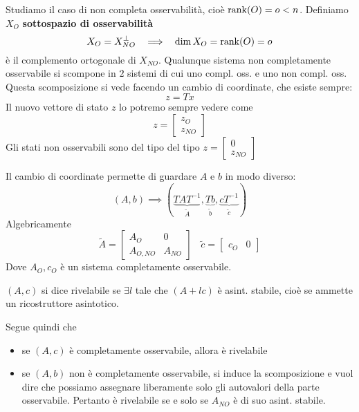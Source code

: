 Studiamo il caso di non completa osservabilità, cioè $\operatorname*{rank}(O) =o< n$. Definiamo $X_O$ \textbf{sottospazio di osservabilità}
\begin{equation*}
	X_O =X^{\perp }_{NO} \ \ \implies \ \ \dim X_O =\operatorname*{rank}(O) =o
\end{equation*}
è il complemento ortogonale di $X_{NO}$. Qualunque sistema non completamente osservabile si scompone in $2$ sistemi di cui uno compl. oss. e uno non compl. oss. Questa scomposizione si vede facendo un cambio di coordinate, che esiste sempre:
\begin{equation*}
	z=Tx
\end{equation*}
Il nuovo vettore di stato $z$ lo potremo sempre vedere come
\begin{equation*}
	z=\begin{bmatrix}
	z_O\\
	z_{NO}
	\end{bmatrix}
\end{equation*}
Gli stati non osservabili sono del tipo del tipo $z=\begin{bmatrix}
0\\
z_{NO}
\end{bmatrix}$

Il cambio di coordinate permette di guardare $A$ e $b$ in modo diverso:
\begin{equation*}
	(A,b)\implies \left(\underbrace{TAT^{-1}}_{\tilde{A}} ,\underbrace{Tb}_{\tilde{b}} ,\underbrace{cT^{-1}}_{\tilde{c}}\right)
\end{equation*}
Algebricamente
\begin{equation*}
	\tilde{A} =\begin{bmatrix}
	A_O & 0\\
	A_{O,NO} & A_{NO}
	\end{bmatrix} \ \ \ \ \tilde{c} =\begin{bmatrix}
	c_O & 0
	\end{bmatrix}
\end{equation*}
Dove $A_O ,c_O$ è un sistema completamente osservabile.
\begin{defn}
	$(A,c)$ si dice rivelabile se $\exists l$ tale che $(A+lc)$ è asint. stabile, cioè se ammette un ricostruttore asintotico.
\end{defn}
Segue quindi che
\begin{itemize}
	\item se $(A,c)$ è completamente osservabile, allora è rivelabile
	\item se $(A,b)$ non è completamente osservabile, si induce la scomposizione e vuol dire che possiamo assegnare liberamente solo gli autovalori della parte osservabile. Pertanto è rivelabile se e solo se $A_{NO}$ è di suo asint. stabile.
\end{itemize}

